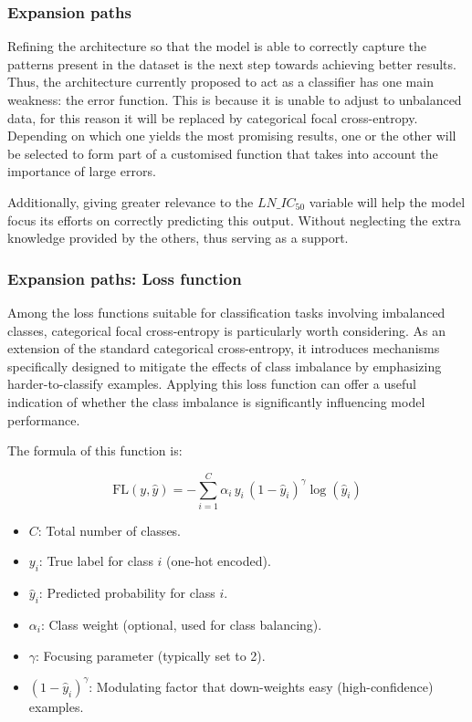 \subsubsection{Expansion paths}

Refining the architecture so that the model is able to correctly capture the patterns present in the dataset is the next step towards achieving better results. Thus, the architecture currently proposed to act as a classifier has one main weakness: the error function. This is because it is unable to adjust to unbalanced data, for this reason it will be replaced by categorical focal cross-entropy. Depending on which one yields the most promising results, one or the other will be selected to form part of a customised function that takes into account the importance of large errors.

Additionally, giving greater relevance to the \(LN\_IC_{50}\) variable will help the model focus its efforts on correctly predicting this output. Without neglecting the extra knowledge provided by the others, thus serving as a support.

\subsubsection{Expansion paths: Loss function}

Among the loss functions suitable for classification tasks involving imbalanced classes, categorical focal cross-entropy is particularly worth considering. As an extension of the standard categorical cross-entropy, it introduces mechanisms specifically designed to mitigate the effects of class imbalance by emphasizing harder-to-classify examples. Applying this loss function can offer a useful indication of whether the class imbalance is significantly influencing model performance. 

The formula of this function is:

\[
\text{FL}(y, \hat{y}) = -\sum_{i=1}^{C} \alpha_i \, y_i \, (1 - \hat{y}_i)^\gamma \log(\hat{y}_i)
\]

\begin{itemize}
    \item \( C \): Total number of classes.
    \item \( y_i \): True label for class \( i \) (one-hot encoded).
    \item \( \hat{y}_i \): Predicted probability for class \( i \).
    \item \( \alpha_i \): Class weight (optional, used for class balancing).
    \item \( \gamma \): Focusing parameter (typically set to 2).
    \item \( (1 - \hat{y}_i)^\gamma \): Modulating factor that down-weights easy (high-confidence) examples.
\end{itemize}

